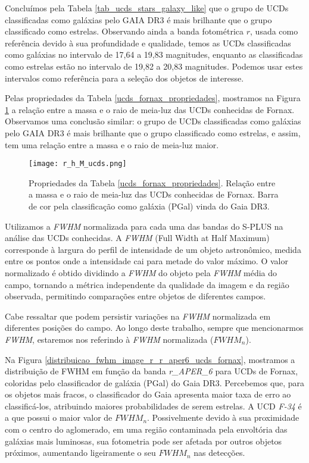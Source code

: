 Concluímos pela Tabela \ref{tab_ucds_stars_galaxy_like} que o grupo de UCDs classificadas como galáxias pelo GAIA DR3 é mais brilhante que o grupo classificado como estrelas. Observando ainda a banda fotométrica $r$, usada como referência devido à sua profundidade e qualidade, temos as UCDs classificadas como galáxias no intervalo de 17,64 a 19,83 magnitudes, enquanto as classificadas como estrelas estão no intervalo de 19,82 a 20,83 magnitudes. Podemos usar estes intervalos como referência para a seleção dos objetos de interesse.

Pelas propriedades da Tabela \ref{ucds_fornax_propriedades}, mostramos na Figura \ref{r_h_M_ucds} a relação entre a massa e o raio de meia-luz das UCDs conhecidas de Fornax. Observamos uma conclusão similar: o grupo de UCDs classificadas como galáxias pelo GAIA DR3 é mais brilhante que o grupo classificado como estrelas, e assim, tem uma relação entre a massa e o raio de meia-luz maior.

\begin{figure}[!ht]
    \centering
    \texttt{[image: r\_h\_M\_ucds.png]} 
    \caption[]{Propriedades da Tabela \ref{ucds_fornax_propriedades}. Relação entre a massa e o raio de meia-luz das UCDs conhecidas de Fornax. Barra de cor pela classificação como galáxia (PGal) vinda do Gaia DR3.}
    \label{r_h_M_ucds}
\end{figure}


Utilizamos a \textit{FWHM} normalizada para cada uma das bandas do S-PLUS na análise das UCDs conhecidas. A \textit{FWHM} (Full Width at Half Maximum) corresponde à largura do perfil de intensidade de um objeto astronômico, medida entre os pontos onde a intensidade cai para metade do valor máximo. O valor normalizado é obtido dividindo a \textit{FWHM} do objeto pela \textit{FWHM} média do campo, tornando a métrica independente da qualidade da imagem e da região observada, permitindo comparações entre objetos de diferentes campos.

Cabe ressaltar que podem persistir variações na \textit{FWHM} normalizada em diferentes posições do campo. Ao longo deste trabalho, sempre que mencionarmos \textit{FWHM}, estaremos nos referindo à \textit{FWHM} normalizada ($\textit{FWHM}_n$).

Na Figura \ref{distribuicao_fwhm_image_r_r_aper6_ucds_fornax}, mostramos a distribuição de \ac{FWHM} em função da banda \textit{r\_APER\_6} para UCDs de Fornax, coloridas pelo classificador de galáxia (PGal) do Gaia DR3. Percebemos que, para os objetos mais fracos, o classificador do Gaia apresenta maior taxa de erro ao classificá-los, atribuindo maiores probabilidades de serem estrelas. A UCD \textit{F-34} é a que possui o maior valor de $\textit{FWHM}_n$. Possivelmente devido à sua proximidade com o centro do aglomerado, em uma região contaminada pela envoltória das galáxias mais luminosas, sua fotometria pode ser afetada por outros objetos próximos, aumentando ligeiramente o seu $\textit{FWHM}_n$ nas detecções.

